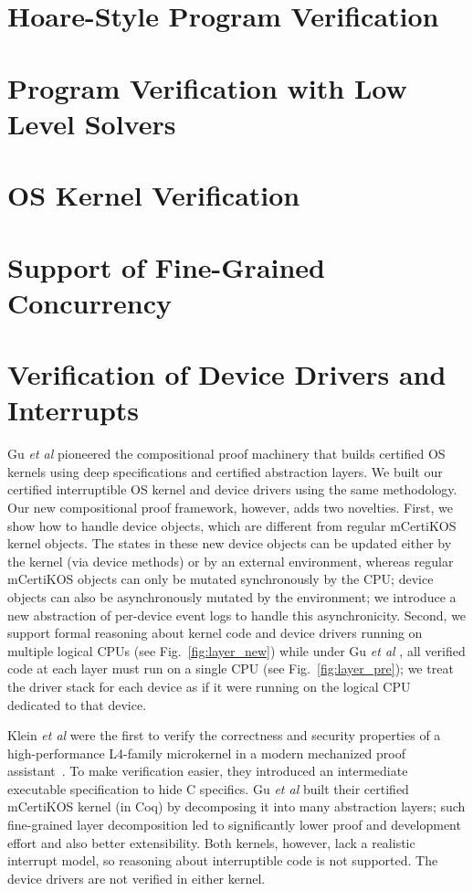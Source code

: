 \label{chapt:related}

\section{Hoare-Style Program Verification}

\section{Program Verification with Low Level Solvers}

\section{OS Kernel Verification}

\section{Support of Fine-Grained Concurrency}

\section{Verification of Device Drivers and Interrupts}

Gu {\em et al} \cite{dscal15} pioneered the compositional
proof machinery that
builds certified OS kernels using deep specifications and certified
abstraction layers. We built our certified interruptible OS kernel and
device drivers using the same methodology. Our new compositional proof
framework, however, adds two novelties.
First, we show how to handle
device objects, which are different from regular mCertiKOS kernel
objects. The states in these new device objects can be updated either
by the kernel (via device methods) or by an external environment,
whereas regular mCertiKOS objects can only be mutated synchronously by
the CPU; device objects can also be asynchronously mutated by the
environment; we introduce a new abstraction of per-device event logs
to handle this asynchronicity.
Second, we support formal reasoning about kernel code and device
drivers running on multiple logical CPUs (see
Fig.~\ref{fig:layer_new}) while under Gu {\em et al} \cite{dscal15}, all verified
code at each layer must run on a single CPU (see
Fig.~\ref{fig:layer_pre}); we treat the driver stack for each device
as if it were running on the logical CPU dedicated to that device.

Klein {\em et al} \cite{klein2009sel4} were the first to verify the correctness and
security properties of a high-performance L4-family microkernel in a
modern mechanized proof assistant~\cite{Paulson:Isabelle}.  To make
verification easier, they introduced an intermediate executable
specification to hide C specifics. Gu {\em et al} \cite{dscal15} built their
certified mCertiKOS kernel (in Coq) by decomposing it into many
abstraction layers; such fine-grained layer decomposition led to
significantly lower proof and development effort and also better
extensibility. Both kernels, however, lack a realistic
interrupt model, so reasoning about interruptible code is not
supported. The device drivers are not verified in either kernel.

